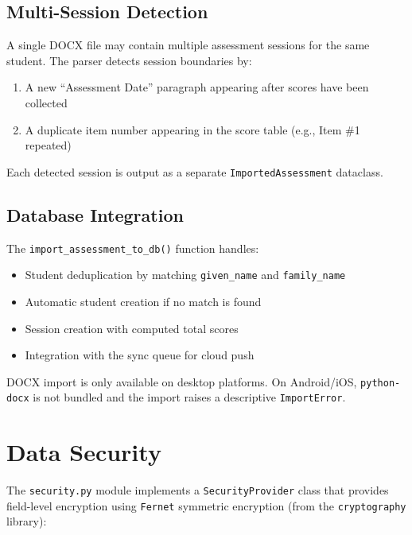 \documentclass[12pt,a4paper]{article}
\begin{document}
\subsection{Multi-Session Detection}

A single DOCX file may contain multiple assessment sessions for the same student. The parser detects session boundaries by:

\begin{enumerate}[leftmargin=2em]
    \item A new ``Assessment Date'' paragraph appearing after scores have been collected
    \item A duplicate item number appearing in the score table (e.g., Item \#1 repeated)
\end{enumerate}

Each detected session is output as a separate \texttt{ImportedAssessment} dataclass.

\subsection{Database Integration}

The \texttt{import\_assessment\_to\_db()} function handles:

\begin{itemize}[leftmargin=2em]
    \item Student deduplication by matching \texttt{given\_name} and \texttt{family\_name}
    \item Automatic student creation if no match is found
    \item Session creation with computed total scores
    \item Integration with the sync queue for cloud push
\end{itemize}

\begin{warnbox}
DOCX import is only available on desktop platforms. On Android/iOS, \texttt{python-docx} is not bundled and the import raises a descriptive \texttt{ImportError}.
\end{warnbox}

\section{Data Security}

The \texttt{security.py} module implements a \texttt{SecurityProvider} class that provides field-level encryption using \texttt{Fernet} symmetric encryption (from the \texttt{cryptography} library):
\end{document}
